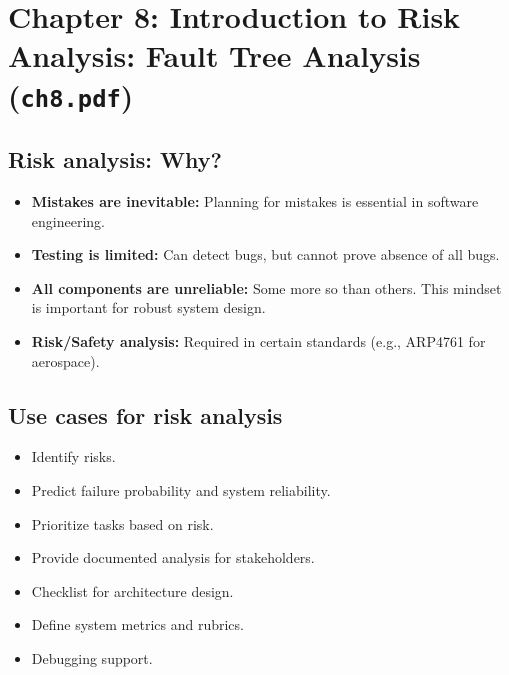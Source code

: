 \documentclass[11pt,a4paper]{article}
\begin{document}
\section{Chapter 8: Introduction to Risk Analysis: Fault Tree Analysis (\texttt{ch8.pdf})}

\subsection*{Risk analysis: Why?}
\begin{itemize}
    \item \textbf{Mistakes are inevitable:} Planning for mistakes is essential in software engineering.
    \item \textbf{Testing is limited:} Can detect bugs, but cannot prove absence of all bugs.
    \item \textbf{All components are unreliable:} Some more so than others. This mindset is important for robust system design.
    \item \textbf{Risk/Safety analysis:} Required in certain standards (e.g., ARP4761 for aerospace).
\end{itemize}

\subsection*{Use cases for risk analysis}
\begin{itemize}
    \item Identify risks.
    \item Predict failure probability and system reliability.
    \item Prioritize tasks based on risk.
    \item Provide documented analysis for stakeholders.
    \item Checklist for architecture design.
    \item Define system metrics and rubrics.
    \item Debugging support.
\end{itemize}
\end{document}
